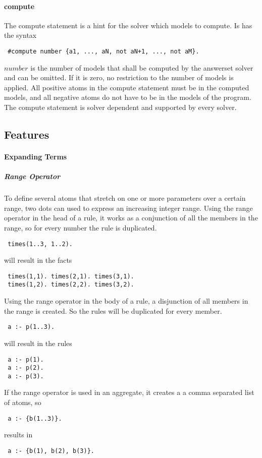 \documentclass[a4paper,10pt]{article}
\begin{document}
\paragraph{compute}
The compute statement is a hint for the solver which models to compute.
Is has the syntax
\begin{verbatim}
 #compute number {a1, ..., aN, not aN+1, ..., not aM}.
\end{verbatim}
$number$ is the number of models that shall be computed by the answerset solver and can be omitted. If it is zero, no restriction to the number of models is applied.
All positive atoms in the compute statement must be in the computed models, and all negative atoms do not have to be in the models of the program.
The compute statement is solver dependent and supported by every solver.
\subsection{Features}
\paragraph{Expanding Terms}
\subparagraph{Range Operator}
To define several atoms that stretch on one or more parameters over a certain range, two dots can used to express an increasing integer range.
Using the range operator in the head of a rule, it works as a conjunction of all the members in the range, so for every number the rule is duplicated.
\begin{verbatim}
 times(1..3, 1..2).
\end{verbatim}
will result in the facts
\begin{verbatim}
 times(1,1). times(2,1). times(3,1).
 times(1,2). times(2,2). times(3,2).
\end{verbatim}

Using the range operator in the body of a rule, a disjunction of all members in the range is created. So the rules will be duplicated for every member.
\begin{verbatim}
 a :- p(1..3).
\end{verbatim}
will result in the rules
\begin{verbatim}
 a :- p(1).
 a :- p(2).
 a :- p(3).
\end{verbatim}
If the range operator is used in an aggregate, it creates a a comma separated list of atoms, so
\begin{verbatim}
 a :- {b(1..3)}.
\end{verbatim}
results in
\begin{verbatim}
 a :- {b(1), b(2), b(3)}.
\end{verbatim}
\end{document}
